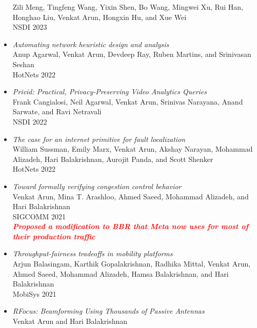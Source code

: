 \documentclass[notitlepage]{article}
\newcommand{\highlight}[1]{\textcolor{red}{\textit{\textbf{#1}}}}
\begin{document}
\begin{itemize}[noitemsep,nolistsep]
      Zili Meng, Tingfeng Wang, Yixin Shen, Bo Wang, Mingwei Xu, Rui Han, Honghao Liu, Venkat Arun, Hongxin Hu, and Xue Wei\\
      NSDI 2023\\
              \item {\it Automating network heuristic design and analysis}\label{paper:ccmatic_hotnets}\\
      Anup Agarwal, Venkat Arun, Devdeep Ray, Ruben Martins, and Srinivasan Seshan\\
      HotNets 2022\\
              \item {\it Privid: Practical, Privacy-Preserving Video Analytics Queries}\label{paper:privid}\\
      Frank Cangialosi, Neil Agarwal, Venkat Arun, Srinivas Narayana, Anand Sarwate, and Ravi Netravali\\
      NSDI 2022\\
              \item {\it The case for an internet primitive for fault localization}\label{paper:wtf}\\
      William Sussman, Emily Marx, Venkat Arun, Akshay Narayan, Mohammad Alizadeh, Hari Balakrishnan, Aurojit Panda, and Scott Shenker\\
      HotNets 2022\\
              \item {\it Toward formally verifying congestion control behavior}\label{paper:ccac}\\
      Venkat Arun, Mina T. Arashloo, Ahmed Saeed, Mohammad Alizadeh, and Hari Balakrishnan\\
      SIGCOMM 2021\\
              \highlight{Proposed a modification to BBR that Meta now uses for most of their production traffic}\\
              \item {\it Throughput-fairness tradeoffs in mobility platforms}\label{paper:drones}\\
      Arjun Balasingam, Karthik Gopalakrishnan, Radhika Mittal, Venkat Arun, Ahmed Saeed, Mohammad Alizadeh, Hamsa Balakrishnan, and Hari Balakrishnan\\
      MobiSys 2021\\
              \item {\it RFocus: Beamforming Using Thousands of Passive Antennas}\label{paper:rfocus}\\
      Venkat Arun and Hari Balakrishnan\\

\end{itemize}
\end{document}
